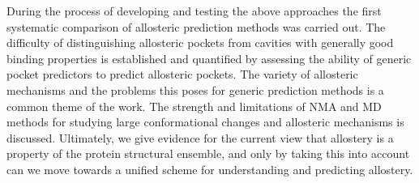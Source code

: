 During the process of developing and testing the above approaches the first systematic comparison of allosteric prediction methods was carried out.
The difficulty of distinguishing allosteric pockets from cavities with generally good binding properties is established and quantified by assessing the ability of generic pocket predictors to predict allosteric pockets.
The variety of allosteric mechanisms \cite{Motlagh2014} and the problems this poses for generic prediction methods is a common theme of the work.
The strength and limitations of NMA and MD methods for studying large conformational changes and allosteric mechanisms is discussed.
Ultimately, we give evidence for the current view that allostery is a property of the protein structural ensemble, and only by taking this into account can we move towards a unified scheme for understanding and predicting allostery.
